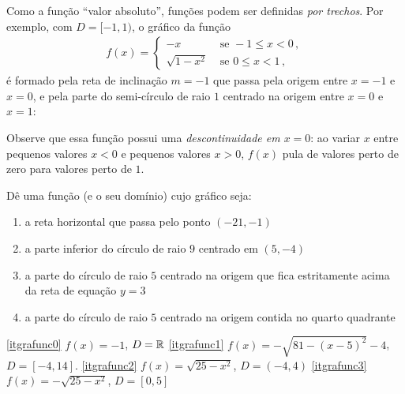 \begin{ex} Como a função ``valor absoluto'', funções podem ser definidas \emph{por
trechos}. Por exemplo, com $D=[-1,1)$, o gráfico da função
\begin{align*}
f(x)=
\begin{cases}
-x&\text{ se }-1\leq x< 0\,,\\
\sqrt{1-x^2}&\text{ se }0\leq x< 1\,,
\end{cases}
\end{align*}
é formado pela reta de inclinação $m=-1$ que passa pela origem
entre $x=-1$ e $x=0$, e pela parte do semi-círculo de raio $1$ centrado na origem 
entre $x=0$ e $x=1$:
\begin{center}
\begin{bmlimage}\end{bmlimage}
\end{center}
 Observe que essa função possui uma \emph{descontinuidade em $x=0$}: ao variar $x$ entre
pequenos valores $x<0$ e pequenos valores $x>0$, $f(x)$ pula de valores perto de zero para
valores perto de $1$. 
\end{ex}

\begin{exo}
Dê uma função (e o seu domínio) cujo gráfico seja:
\begin{enumerate}
\item \label{itgrafunc0} a reta horizontal que passa pelo ponto $(-21,-1)$
\item\label{itgrafunc1} a parte inferior do círculo de raio $9$ centrado 
em $(5,-4)$ 
\item \label{itgrafunc2} a parte do círculo de raio $5$ centrado na 
origem que fica
estritamente acima da reta de equação $y=3$
\item \label{itgrafunc3} a parte do círculo de raio $5$ centrado na 
origem contida no quarto quadrante
\end{enumerate}
\vspace{0.01cm}
\begin{sol}
\eqref{itgrafunc0} $f(x)=-1$, $D=\mathbb{R}$
\eqref{itgrafunc1} $f(x)=-\sqrt{81-(x-5)^2}-4$, $D=[-4,14]$.
\eqref{itgrafunc2} $f(x)=\sqrt{25-x^2}$, $D=(-4,4)$
\eqref{itgrafunc3} $f(x)=-\sqrt{25-x^2}$, $D=[0,5]$
\end{sol}
\end{exo}

